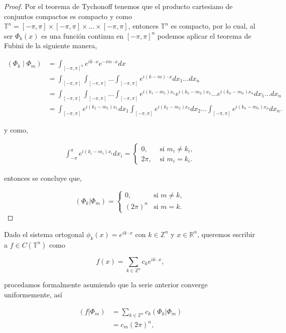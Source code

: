 \documentclass[12pt]{article}
\newcommand\R{\ensuremath{\mathbb{R}}}
\newcommand\Z{\ensuremath{\mathbb{Z}}}
\newcommand\T{\mathbb{T}}
\begin{document}
\begin{proof}
Por el teorema de Tychonoff tenemos que el producto cartesiano de conjuntos compactos es compacto y como $\T^{n}=[-\pi,\pi]\times [-\pi,\pi]\times\ldots\times[-\pi,\pi]$, entonces $\T^{n}$ es compacto, por lo cual, al ser $\Phi_k(x)$ es una función continua en $[-\pi,\pi]^n$ podemos aplicar el teorema de Fubini de la siguiente manera,

\begin{align*}
    \left(\Phi_k \mid \Phi_m\right)&=\int_{[-\pi,\pi]^n}e^{ik \cdot x}e^{-im\cdot x}dx\\
    &=\int_{[-\pi,\pi]}\int_{[-\pi,\pi]}\ldots \int_{[-\pi,\pi]}e^{i(k-m) \cdot x}dx_1\ldots dx_n\\
    &=\int_{[-\pi,\pi]}\int_{[-\pi,\pi]}\ldots \int_{[-\pi,\pi]}e^{i(k_1-m_1) x_1}e^{i(k_2-m_2) x_2}\ldots e^{i(k_n-m_n) x_n}dx_1\ldots dx_n\\
    &=\int_{[-\pi,\pi]}e^{i(k_1-m_1) x_1}dx_1\int_{[-\pi,\pi]}e^{i(k_2-m_2) x_2}dx_2\ldots \int_{[-\pi,\pi]} e^{i(k_n-m_n) x_n}dx_n
.\end{align*}

y como,

$$
\begin{aligned}
\int_{-\pi}^\pi e^{i(k_i-m_i)x_i} d x_i= \begin{cases}0, & \text { si } m_i \neq k_i, \\
2 \pi, & \text { si } m_i=k_i.\end{cases}
\end{aligned}
$$

entonces se concluye que,

$$(\Phi_k|\Phi_m)=\begin{cases}
0, \quad &\text{si } m\neq k,\\
(2\pi)^n &\text{si } m=k.
\end{cases}$$

\end{proof}

Dado el sistema ortogonal $\phi_k(x)=e^{ik\cdot x}$ con $k\in \Z^n$  y $x\in \R^n$, queremos escribir a $f\in C(\mathbb{T}^n)$ como

$$f(x)=\sum_{k\in \Z^n}c_ke^{ik\cdot x},$$

procedamos formalmente asumiendo que la serie anterior converge uniformemente, así

\begin{align*}
    \left(f|\Phi_m\right)&=\sum_{k\in \Z^n} c_k\left(\Phi_k|\Phi_m\right)\\
    &=c_m (2\pi)^n
,\end{align*}
\end{document}
